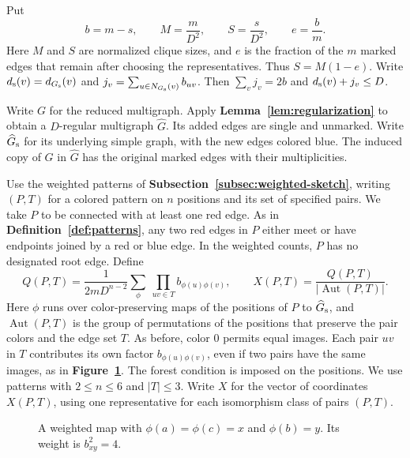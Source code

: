 \documentclass[preprint,11pt,numbers]{elsarticle-arxiv}
\numberwithin{equation}{section}
\theoremstyle{definition}
\begin{document}
Put
\[
 b=m-s,\qquad M=\frac{m}{D^2},\qquad S=\frac{s}{D^2},
 \qquad e=\frac{b}{m}.
\]
Here $M$ and $S$ are normalized clique sizes, and $e$ is the fraction
of the $m$ marked edges that remain after choosing the representatives.
Thus $S=M(1-e)$. Write
$d_{\rm s}(v)=d_{G_{\rm s}}(v)$ and
$j_v=\sum_{u\in N_{G_{\rm s}}(v)}b_{uv}$.
Then $\sum_v j_v=2b$ and $d_{\rm s}(v)+j_v\le D$.

Write $G$ for the reduced multigraph. Apply
\textbf{Lemma~\ref{lem:regularization}} to obtain a $D$-regular
multigraph $\widehat G$. Its added edges are single and unmarked.
Write $\widehat G_{\rm s}$ for its underlying simple graph, with
the new edges colored blue. The induced copy of $G$ in $\widehat G$
has the original marked edges with their multiplicities.

Use the weighted patterns of
\textbf{Subsection~\ref{subsec:weighted-sketch}}, writing $(P,T)$
for a colored pattern on $n$ positions and its set of specified
pairs. We take $P$ to be connected with at least one red edge.
As in \textbf{Definition~\ref{def:patterns}},
any two red edges in $P$ either meet or have endpoints joined by a red
or blue edge. In the weighted counts, $P$ has no designated root edge.
Define
\begin{equation}\label{eq:weighted-count}
 Q(P,T)=\frac{1}{2mD^{n-2}}
       \sum_{\phi}\ \prod_{uv\in T} b_{\phi(u)\phi(v)},
 \qquad
 X(P,T)=\frac{Q(P,T)}{|\operatorname{Aut}(P,T)|}.
\end{equation}
Here $\phi$ runs over color-preserving maps of the positions of $P$
to $\widehat G_{\rm s}$, and $\operatorname{Aut}(P,T)$ is the group of
permutations of the positions that preserve the pair colors and the
edge set $T$. As before, color $0$ permits equal images. Each pair
$uv$ in $T$ contributes its own factor $b_{\phi(u)\phi(v)}$, even
if two pairs have the same images, as in
\textbf{Figure~\ref{fig:weighted-maps}}.
The forest condition is imposed on the positions. We use patterns
with $2\le n\le6$ and $|T|\le3$. Write $X$ for the vector of coordinates
$X(P,T)$, using one representative for each isomorphism class of pairs
$(P,T)$.

\begin{figure}[htbp]
\centering
{}
\caption{A weighted map with $\phi(a)=\phi(c)=x$ and $\phi(b)=y$.
Its weight is $b_{xy}^2=4$.}
\label{fig:weighted-maps}
\end{figure}
\relax\space%
\end{document}

